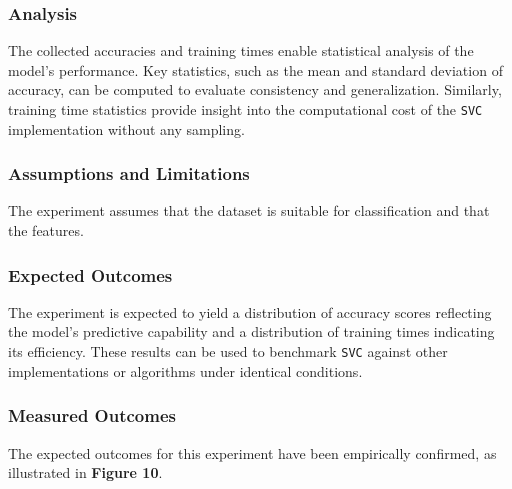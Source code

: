 \documentclass{article}
\theoremstyle{plain}
\theoremstyle{definition}
\theoremstyle{remark}
\begin{document}
\subsubsection{Analysis}

The collected accuracies and training times enable statistical analysis of the model's performance. Key statistics, such as the mean and standard deviation of accuracy, can be computed to evaluate consistency and generalization. Similarly, training time statistics provide insight into the computational cost of the \texttt{SVC} implementation without any sampling.


\subsubsection{Assumptions and Limitations}

The experiment assumes that the dataset is suitable for classification and that the features.


\subsubsection{Expected Outcomes}

The experiment is expected to yield a distribution of accuracy scores reflecting the model's predictive capability and a distribution of training times indicating its efficiency. These results can be used to benchmark \texttt{SVC} against other implementations or algorithms under identical conditions.

\subsubsection{Measured Outcomes}

The expected outcomes for this experiment have been empirically confirmed, as illustrated in \textbf{Figure 10}.
\end{document}
